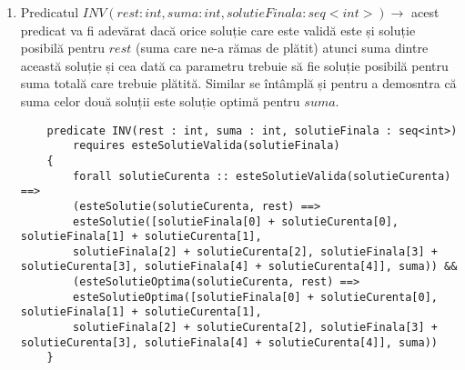 \begin{enumerate}
\item Predicatul $  INV(rest : int, suma : int, solutieFinala : seq<int>) \rightarrow$ acest predicat va fi adevărat dacă orice soluție care este validă este și soluție posibilă pentru $rest$ (suma care ne-a rămas de plătit) atunci suma dintre această soluție și cea dată ca parametru trebuie să fie soluție posibilă pentru suma totală care trebuie plătită. Similar se întâmplă și pentru a demosntra că suma celor două soluții este soluție optimă pentru $suma$.
\begin{lstlisting}
	predicate INV(rest : int, suma : int, solutieFinala : seq<int>)
		requires esteSolutieValida(solutieFinala)
	{
		forall solutieCurenta :: esteSolutieValida(solutieCurenta) ==>
		(esteSolutie(solutieCurenta, rest) ==> 
		esteSolutie([solutieFinala[0] + solutieCurenta[0], solutieFinala[1] + solutieCurenta[1], 
		solutieFinala[2] + solutieCurenta[2], solutieFinala[3] + solutieCurenta[3], solutieFinala[4] + solutieCurenta[4]], suma)) &&
		(esteSolutieOptima(solutieCurenta, rest) ==> 
		esteSolutieOptima([solutieFinala[0] + solutieCurenta[0], solutieFinala[1] + solutieCurenta[1],
		solutieFinala[2] + solutieCurenta[2], solutieFinala[3] + solutieCurenta[3], solutieFinala[4] + solutieCurenta[4]], suma))
	}
\end{lstlisting}
\end{enumerate}




